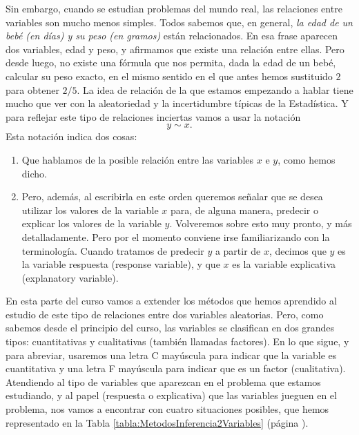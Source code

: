 Sin embargo, cuando se estudian problemas del mundo real, las relaciones entre variables son mucho menos simples. Todos sabemos que, en general, {\em la edad de un bebé (en días) y su peso (en gramos)} están relacionados. En esa frase aparecen dos variables, edad y peso, y afirmamos que existe una relación entre ellas. Pero desde luego, no existe una fórmula que nos permita, dada la edad de un bebé, calcular su peso exacto, en el mismo sentido en el que antes hemos sustituido $2$ para obtener $2/5$. La idea de relación de la que estamos empezando a hablar tiene mucho que ver con la aleatoriedad y la incertidumbre típicas de la Estadística. Y para reflejar este tipo de {\sf relaciones inciertas} vamos a usar la notación
\[y \sim x.\]
Esta notación indica dos cosas:
\begin{enumerate}
  \item Que hablamos de la posible relación entre las variables $x$ e $y$, como hemos dicho.
  \item Pero, además, al escribirla en este orden queremos señalar que se desea utilizar los valores de la variable $x$ para, de alguna manera, predecir o explicar los valores de la variable $y$. Volveremos sobre esto muy pronto, y más detalladamente. Pero por el momento conviene irse familiarizando con la terminología. Cuando tratamos de predecir $y$ a partir de $x$, decimos que $y$ es la {\sf variable respuesta (response variable)}, y que $x$ es la {\sf variable explicativa (explanatory variable)}.
\end{enumerate}

En esta parte del curso vamos a extender los métodos que hemos aprendido al estudio de este tipo de relaciones entre dos variables aleatorias. Pero, como sabemos desde el principio del curso, las variables se clasifican en dos grandes tipos: cuantitativas y cualitativas (también llamadas factores). En lo que sigue, y para abreviar, usaremos una letra C mayúscula para indicar que la variable es cuantitativa y una letra F mayúscula para indicar que es un factor (cualitativa). Atendiendo al tipo de variables que aparezcan en el problema que estamos estudiando, y al papel (respuesta o explicativa) que las variables jueguen en el problema, nos vamos a encontrar con cuatro situaciones posibles, que hemos representado en la Tabla \ref{tabla:MetodosInferencia2Variables} (página \pageref{tabla:MetodosInferencia2Variables}).

